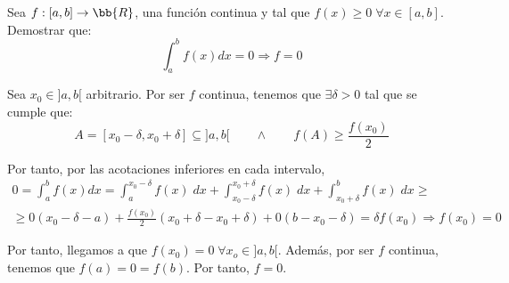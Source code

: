 \begin{ejercicio}\label{Ejercicio3}
    Sea $f:[a,b]\to \bb{R}$, una función continua y tal que $f(x)\geq 0\;\forall x\in [a,b]$. Demostrar que:
    \begin{equation*}
        \int_a^bf(x)dx = 0 \Longrightarrow f=0
    \end{equation*}

    Sea $x_0\in ]a,b[$ arbitrario. Por ser $f$ continua, tenemos que $\exists \delta>0$ tal que se cumple que:
    \begin{equation*}
        A=[x_0-\delta, x_0+\delta] \subseteq ]a,b[
        \qquad \land \qquad
        f(A) \geq \frac{f(x_0)}{2}
    \end{equation*}

    Por tanto, por las acotaciones inferiores en cada intervalo,
    \begin{multline*}
        0 = \int_a^bf(x)dx =
        \int_a^{x_0-\delta} f(x)\;dx + \int_{x_0-\delta}^{x_0+\delta}f(x)\;dx +\int_{x_0+\delta}^b f(x)\;dx
        \geq \\ \geq
        0(x_0-\delta-a) +\frac{f(x_0)}{2}(x_0+\delta -x_0 +\delta) + 0(b-x_0-\delta) = \delta f(x_0) \Longrightarrow f(x_0)=0
    \end{multline*}

    Por tanto, llegamos a que $f(x_0)=0 \; \forall x_o \in ]a,b[$. Además, por ser $f$ continua, tenemos que $f(a)=0=f(b)$. Por tanto, $f=0$.
\end{ejercicio}

